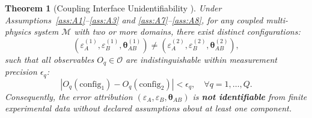 \documentclass[11pt,a4paper]{article}
\newtheorem{theorem}{Theorem}[section]
\theoremstyle{definition}
\begin{document}
\begin{theorem}[Coupling Interface Unidentifiability ]\label{thm:coupling_unidentifiability}
Under Assumptions~\ref{ass:A1}--\ref{ass:A3} and \ref{ass:A7}--\ref{ass:A8}, for any coupled multi-physics system $\mathcal{M}$ with two or more domains, there exist distinct configurations:
\begin{equation}
(\varepsilon_A^{(1)}, \varepsilon_B^{(1)}, \boldsymbol{\theta}_{AB}^{(1)}) \neq (\varepsilon_A^{(2)}, \varepsilon_B^{(2)}, \boldsymbol{\theta}_{AB}^{(2)}),
\end{equation}
such that all observables $O_q \in \mathcal{O}$ are indistinguishable within measurement precision $\epsilon_q$:
\begin{equation}\label{eq:obs_equiv_coupled}
|O_q(\text{config}_1) - O_q(\text{config}_2)| < \epsilon_q, \quad \forall q = 1, \ldots, Q.
\end{equation}
Consequently, the error attribution $(\varepsilon_A, \varepsilon_B, \boldsymbol{\theta}_{AB})$ is \textbf{not identifiable} from finite experimental data without declared assumptions about at least one component.
\end{theorem}
\end{document}
